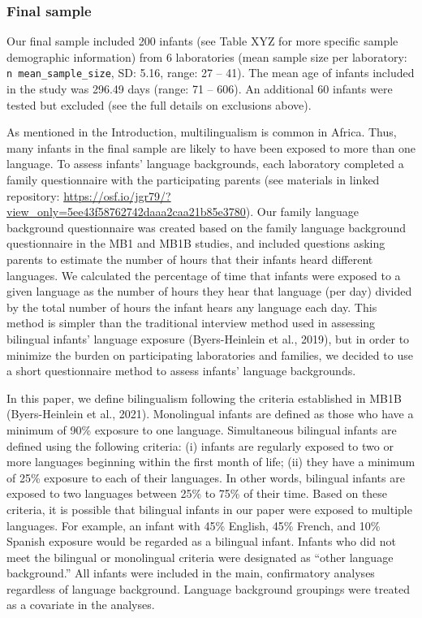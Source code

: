 \documentclass[
  ,man,floatsintext]{apa6}
\begin{document}
\hypertarget{final-sample}{%
\subsubsection{Final sample}\label{final-sample}}

Our final sample included 200 infants (see Table XYZ for more specific sample demographic information) from 6 laboratories (mean sample size per laboratory: \texttt{n\ mean\_sample\_size}, SD: 5.16, range: 27 -- 41). The mean age of infants included in the study was 296.49 days (range: 71 -- 606). An additional 60 infants were tested but excluded (see the full details on exclusions above).

As mentioned in the Introduction, multilingualism is common in Africa. Thus, many infants in the final sample are likely to have been exposed to more than one language. To assess infants' language backgrounds, each laboratory completed a family questionnaire with the participating parents (see materials in linked repository: \url{https://osf.io/jgr79/?view_only=5ee43f58762742daaa2caa21b85e3780}). Our family language background questionnaire was created based on the family language background questionnaire in the MB1 and MB1B studies, and included questions asking parents to estimate the number of hours that their infants heard different languages. We calculated the percentage of time that infants were exposed to a given language as the number of hours they hear that language (per day) divided by the total number of hours the infant hears any language each day. This method is simpler than the traditional interview method used in assessing bilingual infants' language exposure (Byers-Heinlein et al., 2019), but in order to minimize the burden on participating laboratories and families, we decided to use a short questionnaire method to assess infants' language backgrounds.

In this paper, we define bilingualism following the criteria established in MB1B (Byers-Heinlein et al., 2021). Monolingual infants are defined as those who have a minimum of 90\% exposure to one language. Simultaneous bilingual infants are defined using the following criteria: (i) infants are regularly exposed to two or more languages beginning within the first month of life; (ii) they have a minimum of 25\% exposure to each of their languages. In other words, bilingual infants are exposed to two languages between 25\% to 75\% of their time. Based on these criteria, it is possible that bilingual infants in our paper were exposed to multiple languages. For example, an infant with 45\% English, 45\% French, and 10\% Spanish exposure would be regarded as a bilingual infant. Infants who did not meet the bilingual or monolingual criteria were designated as ``other language background.'' All infants were included in the main, confirmatory analyses regardless of language background. Language background groupings were treated as a covariate in the analyses.
\end{document}
